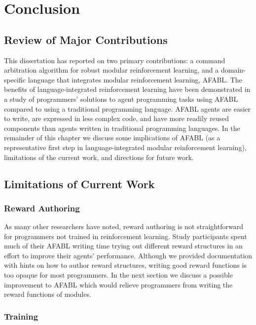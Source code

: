 \chapter{Conclusion}\label{ch:conclusion}

\section{Review of Major Contributions}

This dissertation has reported on two primary contributions: a command arbitration algorithm for robust modular reinforcement learning, and a domain-specific language that integrates modular reinforcement learning, AFABL. The benefits of language-integrated reinforcement learning have been demonstrated in a study of programmers' solutions to agent programming tasks using AFABL compared to using a traditional programming language. AFABL agents are easier to write, are expressed in less complex code, and have more readily reused components than agents written in traditional programming languages. In the remainder of this chapter we discuss some implications of AFABL (as a representative first step in language-integrated modular reinforcement learning), limitations of the current work, and directions for future work.

\section{Limitations of Current Work}


\subsection{Reward Authoring}

As many other researchers have noted, reward authoring is not straightforward for programmers not trained in reinforcement learning. Study participants spent much of their AFABL writing time trying out different reward structures in an effort to improve their agents' performance. Although we provided documentation with hints on how to author reward structures, writing good reward functions is too opaque for most programmers. In the next section we discuss a possible improvement to AFABL which would relieve programmers from writing the reward functions of modules.

\subsection{Training}

